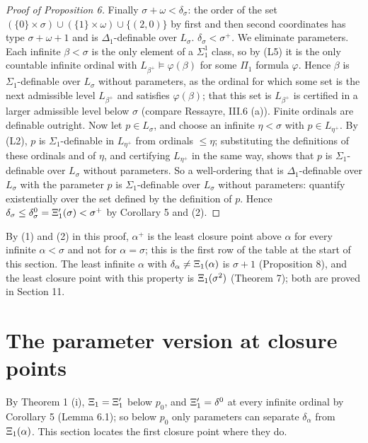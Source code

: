 \documentclass[11pt]{article}
\begin{document}
\begin{proof}[Proof of Proposition 6]
Finally $\sigma + \omega < \delta_{\sigma}$: the order of the set $(\{0\} \times \sigma) \cup (\{1\} \times \omega) \cup \{(2, 0)\}$
by first and then second coordinates has type $\sigma + \omega + 1$ and is $\Delta_1$-definable over $L_{\sigma}$. 
\emph{$\delta_{\sigma} < \sigma^+$.} We eliminate parameters. Each infinite $\beta < \sigma$ is the only element of
a $\Sigma^1_1$ class, so by (L5) it is the only countable infinite ordinal with
$L_{\beta^+} \models \varphi(\beta)$ for some $\Pi_1$ formula $\varphi$. Hence $\beta$ is $\Sigma_1$-definable
over $L_{\sigma}$ without parameters, as the ordinal for which some set is the next admissible level $L_{\beta^+}$
and satisfies $\varphi(\beta)$; that this set is $L_{\beta^+}$ is certified in a larger admissible level below
$\sigma$ (compare Ressayre, III.6 (a)). Finite ordinals are definable outright. Now let $p \in L_{\sigma}$, and
choose an infinite $\eta < \sigma$ with $p \in L_{\eta^+}$. By (L2), $p$ is $\Sigma_1$-definable in $L_{\eta^+}$
from ordinals $\le \eta$; substituting the definitions of these ordinals and of $\eta$, and certifying
$L_{\eta^+}$ in the same way, shows that $p$ is $\Sigma_1$-definable over $L_{\sigma}$ without parameters. So a
well-ordering that is $\Delta_1$-definable over $L_{\sigma}$ with the parameter $p$ is $\Sigma_1$-definable over
$L_{\sigma}$ without parameters: quantify existentially over the set defined by the definition of $p$. Hence
$\delta_{\sigma} \le \delta^0_{\sigma} = \Xi'_1(\sigma) < \sigma^+$ by Corollary 5 and (2).
\end{proof}

By (1) and (2) in this proof, $\alpha^+$ is the least closure point above $\alpha$ for every infinite
$\alpha < \sigma$ and not for $\alpha = \sigma$; this is the first row of the table at the start of this section. The least
infinite $\alpha$ with $\delta_{\alpha} \ne \Xi_1(\alpha)$ is $\sigma + 1$ (Proposition 8), and the least closure
point with this property is $\Xi_1(\sigma^2)$ (Theorem 7); both are proved in Section 11.

\section{The parameter version at closure points}

By Theorem 1 (i), $\Xi_1 = \Xi'_1$ below $p_0$, and $\Xi'_1 = \delta^0_{}$ at every infinite ordinal by Corollary 5 (Lemma
6.1); so below $p_0$ only parameters can separate $\delta_{\alpha}$ from $\Xi_1(\alpha)$. This section locates the
first closure point where they do.
\end{document}
